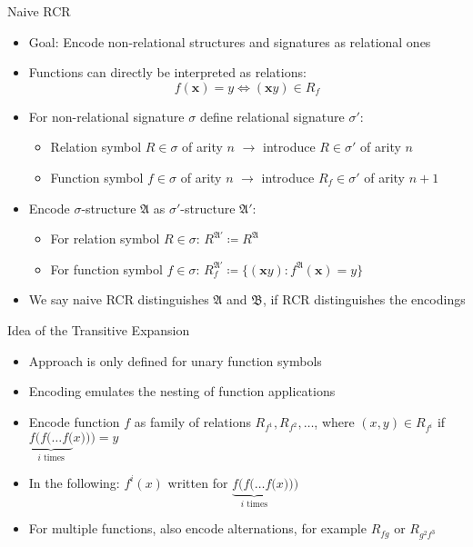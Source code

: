 \documentclass[aspectratio=169]{beamer}
\newcommand{\term}[1]{\operatorname{\mathit{#1}}}
\begin{document}
	\begin{frame}{Naive RCR}
		\begin{itemize}
			\item Goal: Encode non-relational structures and signatures as relational ones
			\item Functions can directly be interpreted as relations:
			$$f(\mathbf x)=y \Longleftrightarrow (\mathbf xy)\in R_f$$
			\item For non-relational signature $\sigma$ define relational signature $\sigma'$:
			\begin{itemize}
				\item Relation symbol $R\in\sigma$ of arity $n$ $\rightarrow$ introduce $R\in\sigma'$ of arity $n$
				\item Function symbol $f\in\sigma$ of arity $n$ $\rightarrow$ introduce $R_f\in\sigma'$ of arity $n+1$
			\end{itemize}
			\item Encode $\sigma$-structure $\mathfrak A$ as $\sigma'$-structure $\mathfrak A'$:
			\begin{itemize}
				\item For relation symbol $R\in\sigma$: $R^{\mathfrak A'}\coloneqq R^{\mathfrak A}$
				\item For function symbol $f\in \sigma$: $R_f^{\mathfrak A'}\coloneqq \{(\mathbf xy) : f^{\mathfrak A}(\mathbf x)=y\}$
			\end{itemize}
			\item We say naive RCR distinguishes $\mathfrak A$ and $\mathfrak B$, if RCR distinguishes the encodings
		\end{itemize}
	\end{frame}
	
	\begin{frame}{Idea of the Transitive Expansion}
		\begin{itemize}
			\item Approach is only defined for unary function symbols
			\item Encoding emulates the nesting of function applications
			\item Encode function $f$ as family of relations $R_{f^1},R_{f^2},\dots$, where $(x,y)\in R_{f^i}$ if $\underbrace{f(f(\dots f(}_{i\text{ times}}x)))=y$
			\item In the following: $f^i(x)$ written for $\underbrace{f(f(\dots f(}_{i\text{ times}}x)))$
			\item For multiple functions, also encode alternations, for example $R_{\term {fg}}$ or $R_{g^2f^3}$
		\end{itemize}
	\end{frame}
	
\end{document}
